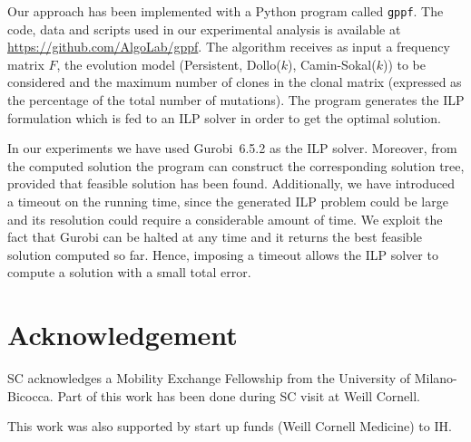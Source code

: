 \documentclass[a4paper,USenglish]{article}
\theoremstyle{definition}
\begin{document}
Our approach has been implemented with a  Python program called \texttt{gppf}. 
  The code, data and scripts used in our experimental analysis is 
  available at \url{https://github.com/AlgoLab/gppf}.
The algorithm receives as input  a frequency matrix $F$, the evolution
  model  (Persistent, Dollo($k$),  Camin-Sokal($k$)) to  be considered
  and the maximum number of clones in the clonal matrix (expressed
  as the percentage of the total number of mutations).
The  program generates  the ILP  formulation which  is fed  to an  ILP
  solver in order to get the optimal solution.

In our experiments we have used Gurobi~6.5.2 as the ILP solver. 
Moreover, from  the computed  solution the  program can  construct the
  corresponding  solution tree,  provided that  feasible solution  has
  been found. 
Additionally, we have introduced a timeout on the running time, since the
  generated ILP problem could be large and its resolution could require
  a considerable amount of time.
%
We exploit the fact that Gurobi can be halted at any time and it returns the best
  feasible solution computed so far.
%
Hence, imposing a timeout allows the ILP solver to compute a solution with a small
  total error.

\section*{Acknowledgement}
SC acknowledges a Mobility Exchange Fellowship from the University of Milano-Bicocca. Part of this work has been done during SC visit at Weill Cornell.


This work was also supported by start up funds (Weill Cornell Medicine) to IH.

% 
%
%
%
% 
%


\end{document}
